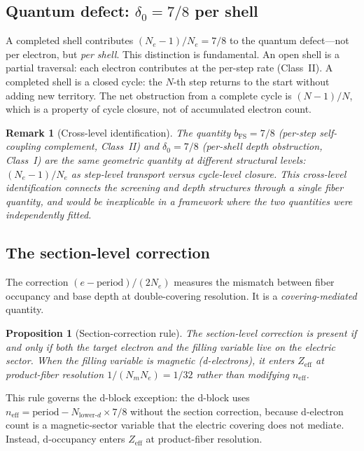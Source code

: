 \documentclass[11pt,a4paper]{article}
\newtheorem{proposition}[theorem]{Proposition}
\newtheorem{remark}[theorem]{Remark}
\begin{document}
\subsection{Quantum defect: $\delta_0 = 7/8$ per shell}

A completed shell contributes $(N_e - 1)/N_e = 7/8$ to the quantum defect---not per electron, but \emph{per shell}. This distinction is fundamental. An open shell is a partial traversal: each electron contributes at the per-step rate (Class~II). A completed shell is a closed cycle: the $N$-th step returns to the start without adding new territory. The net obstruction from a complete cycle is $(N-1)/N$, which is a property of cycle closure, not of accumulated electron count.

\begin{remark}[Cross-level identification]
The quantity $b_{\mathrm{FS}} = 7/8$ (per-step self-coupling complement, Class~II) and $\delta_0 = 7/8$ (per-shell depth obstruction, Class~I) are the same geometric quantity at different structural levels: $(N_e - 1)/N_e$ as step-level transport versus cycle-level closure. This cross-level identification connects the screening and depth structures through a single fiber quantity, and would be inexplicable in a framework where the two quantities were independently fitted.
\end{remark}

\subsection{The section-level correction}

The correction $(e - \mathrm{period})/(2N_e)$ measures the mismatch between fiber occupancy and base depth at double-covering resolution. It is a \emph{covering-mediated} quantity.

\begin{proposition}[Section-correction rule]
\label{prop:section-correction}
The section-level correction is present if and only if both the target electron and the filling variable live on the electric sector. When the filling variable is magnetic (d-electrons), it enters $Z_{\mathrm{eff}}$ at product-fiber resolution $1/(N_m N_e) = 1/32$ rather than modifying $n_{\mathrm{eff}}$.
\end{proposition}

This rule governs the d-block exception: the d-block uses $n_{\mathrm{eff}} = \mathrm{period} - N_{\text{lower-}d} \times 7/8$ without the section correction, because d-electron count is a magnetic-sector variable that the electric covering does not mediate. Instead, d-occupancy enters $Z_{\mathrm{eff}}$ at product-fiber resolution.
\end{document}
